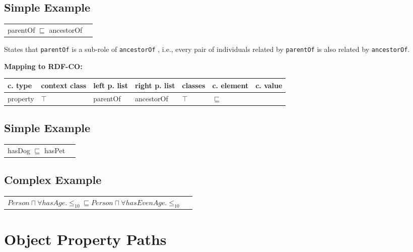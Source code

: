 \documentclass{llncs}
\newcommand{\ms}[1]{\texttt{#1}}
\newenvironment{gcotable}{
  \scriptsize
  \sffamily
  \vspace{0cm}
	\begin{center}
	\textbf{\vspace{0.4cm}Mapping to RDF-CO:} \\
  \begin{tabular}{l|l|l|l|l|l|l}
	\hline
  \textbf{c. type} & \textbf{context class} & \textbf{left p. list} & \textbf{right p. list} & \textbf{classes} & \textbf{c. element} & \textbf{c. value} \\
  \hline

}{
  \hline
  \end{tabular}
	\end{center}
}
\newenvironment{DL}{
  \vspace{0cm}
	\begin{center}
  \begin{tabular}{r l}

}{
  \end{tabular}
	\end{center}
}
\begin{document}
\subsection{Simple Example}

\begin{DL}
parentOf $\sqsubseteq$ ancestorOf 
\end{DL}

States that \ms{parentOf} is a sub-role of \ms{ancestorOf} , i.e., every pair of individuals related by \ms{parentOf} is also related by \ms{ancestorOf}.

\begin{gcotable}
property & $\top$ & parentOf & ancestorOf & $\top$ & $\sqsubseteq$ \\
\end{gcotable}



\subsection{Simple Example}

\begin{DL}
hasDog $\sqsubseteq$ hasPet 
\end{DL}



\subsection{Complex Example}

\begin{DL}
 $Person \sqcap  \forall hasAge. \leq_{10} \sqsubseteq Person \sqcap \forall hasEvenAge. \leq_{10}$ 
\end{DL}

\section{Object Property Paths}
\end{document}
